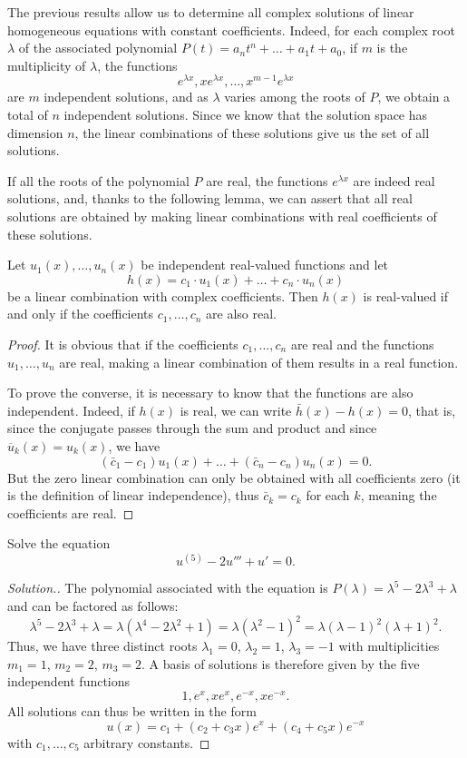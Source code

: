 The previous results allow us to determine all complex solutions of linear 
homogeneous equations with constant coefficients. Indeed, for each complex root
$\lambda$ of the associated polynomial
$P(t) = a_n t^n + \dots + a_1 t + a_0$, if $m$ is the multiplicity of $\lambda$,
the functions 
\[
  e^{\lambda x}, x e^{\lambda x}, \dots, x^{m-1} e^{\lambda x}  
\]
are $m$ independent solutions, and as $\lambda$ varies among the roots of $P$,
we obtain
a total of $n$ independent solutions. Since 
we know that the solution space has dimension $n$, the linear combinations of
these
solutions give us the set of all solutions.

If all the roots of the polynomial $P$ are real, the functions $e^{\lambda x}$
are indeed
real solutions, and, thanks to the following lemma, we can assert that all real
solutions
are obtained by making linear combinations with real coefficients of these
solutions.

\begin{lemma}\label{lm:combinazioni_reali}
Let $u_1(x), \dots, u_n(x)$ be independent real-valued functions
and let 
\[
  h(x) = c_1 \cdot u_1(x) + \dots + c_n \cdot u_n(x)
\]
be a linear combination with complex coefficients.
Then $h(x)$ is real-valued if and only if the coefficients $c_1, \dots, c_n$ 
are also real.
\end{lemma}
%
\begin{proof}
It is obvious that if the coefficients $c_1,\dots,c_n$ are real and the
functions $u_1, \dots, u_n$ are real,
making a linear combination of them results in a real function.

To prove the converse, it is necessary to know that the functions are also
independent. Indeed,
if $h(x)$ is real, we can write $\bar h(x) - h(x) = 0$, that is, since the
conjugate
passes through the sum and product and since $\overline u_k(x) = u_k(x)$, we
have
\[
 (\bar c_1 - c_1) u_1(x) + \dots + (\bar c_n-c_n) u_n(x)=0.
\]
But the zero linear combination can only be obtained with all coefficients zero 
(it is the definition of linear independence), thus $\bar c_k = c_k$ for each
$k$, meaning
the coefficients are real.
\end{proof}

\begin{example}
Solve the equation
\[
  u^{(5)} - 2 u''' + u' = 0.  
\]
\end{example}
%
\begin{proof}[Solution.]
The polynomial associated with the equation is $P(\lambda) = \lambda^5 -
2\lambda^3 + \lambda$
and can be factored as follows:
\[
  \lambda^5 - 2\lambda^3 + \lambda
  = \lambda(\lambda^4-2\lambda^2+1)
  = \lambda(\lambda^2-1)^2
  = \lambda(\lambda-1)^2(\lambda+1)^2.
\]
Thus, we have three distinct roots $\lambda_1=0$, $\lambda_2=1$, $\lambda_3=-1$
with multiplicities
$m_1=1$, $m_2=2$, $m_3=2$.
A basis of solutions is therefore given by the five independent functions
\[
 1, e^x, xe^x, e^{-x}, xe^{-x}.
\]
All solutions can thus be written in the form
\[
  u(x) = c_1 + (c_2 + c_3 x)e^x + (c_4 + c_5 x) e^{-x}  
\]
with $c_1, \dots, c_5$ arbitrary constants.
\end{proof}


